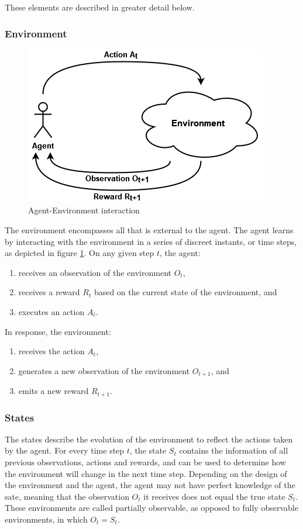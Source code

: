 These elements are described in greater detail below.

\subsubsection{Environment}

\begin{figure}[!h]
    \centering
    \includegraphics[width=.5\textwidth]{figs/RL_schema.png}
    \caption{Agent-Environment interaction}
    \label{fig:interaction}
\end{figure}

The environment encompasses all that is external to the agent. The agent learns by interacting with the environment in a series of discreet instants, or time steps, as depicted in figure \ref{fig:interaction}. On any given step $t$, the agent:

\begin{enumerate}
    \item receives an observation of the environment $O_t$,
    \item receives a reward $R_t$ based on the current state of the environment, and
    \item executes an action $A_t$.
\end{enumerate}

In response, the environment:

\begin{enumerate}
    \item receives the action $A_t$,
    \item generates a new observation of the environment $O_{t+1}$, and
    \item emits a new reward $R_{t+1}$.
\end{enumerate}

\subsubsection{States}

The states describe the evolution of the environment to reflect the actions taken by the agent. For every time step $t$, the state $S_t$ contains the information of all previous observations, actions and rewards, and can be used to determine how the environment will change in the next time step. Depending on the design of the environment and the agent, the agent may not have perfect knowledge of the sate, meaning that the observation $O_t$ it receives does not equal the true state $S_t$. These environments are called partially observable, as opposed to fully observable environments, in which $O_t = S_t$.


